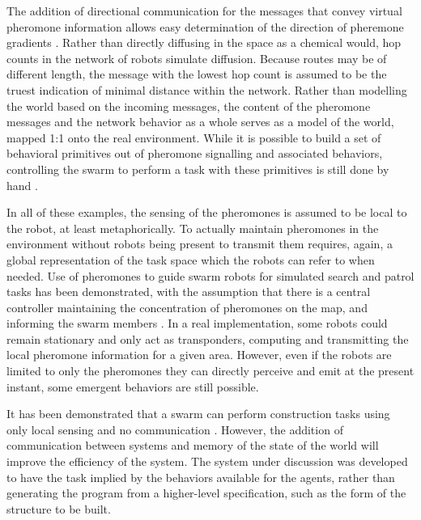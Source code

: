 \documentclass[]{article}
\begin{document}
The addition of directional communication for the messages that convey virtual pheromone information allows easy determination of the direction of pheremone gradients \cite{payton2001pheromone}.
Rather than directly diffusing in the space as a chemical would, hop counts in the network of robots simulate diffusion. 
Because routes may be of different length, the message with the lowest hop count is assumed to be the truest indication of minimal distance within the network. 
Rather than modelling the world based on the incoming messages, the content of the pheromone messages and the network behavior as a whole serves as a model of the world, mapped 1:1 onto the real environment. 
While it is possible to build a set of behavioral primitives out of pheromone signalling and associated behaviors, controlling the swarm to perform a task with these primitives is still done by hand \cite{payton2003compound}.

In all of these examples, the sensing of the pheromones is assumed to be local to the robot, at least metaphorically. 
To actually maintain pheromones in the environment without robots being present to transmit them requires, again, a global representation of the task space which the robots can refer to when needed. 
Use of pheromones to guide swarm robots for simulated search and patrol tasks has been demonstrated, with the assumption that there is a central controller maintaining the concentration of pheromones on the map, and informing the swarm members \cite{coppin2012controlling}. 
In a real implementation, some robots could remain stationary and only act as transponders, computing and transmitting the local pheromone information for a given area. 
However, even if the robots are limited to only the pheromones they can directly perceive and emit at the present instant, some emergent behaviors are still possible. 

It has been demonstrated that a swarm can perform construction tasks using only local sensing and no communication \cite{wawerla2002collective, bowyer2000automated}.
However, the addition of communication between systems and memory of the state of the world will improve the efficiency of the system.
The system under discussion was developed to have the task implied by the behaviors available for the agents, rather than generating the program from a higher-level specification, such as the form of the structure to be built.
\end{document}
